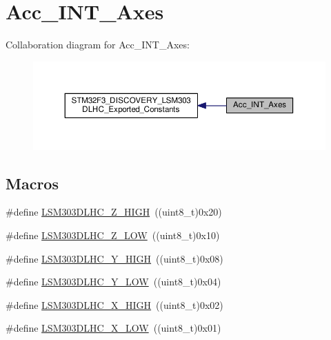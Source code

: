 \hypertarget{group__Acc__INT__Axes}{\section{Acc\+\_\+\+I\+N\+T\+\_\+\+Axes}
\label{group__Acc__INT__Axes}
}
Collaboration diagram for Acc\+\_\+\+I\+N\+T\+\_\+\+Axes\+:\nopagebreak
\begin{figure}[H]
\begin{center}
\leavevmode
\includegraphics[width=350pt]{group__Acc__INT__Axes}
\end{center}
\end{figure}
\subsection*{Macros}
\begin{DoxyCompactItemize}
\item 
\#define \hyperlink{group__Acc__INT__Axes_ga1ed5cf5c88223590c7b36228d02e9107}{L\+S\+M303\+D\+L\+H\+C\+\_\+\+Z\+\_\+\+H\+I\+G\+H}~((uint8\+\_\+t)0x20)
\item 
\#define \hyperlink{group__Acc__INT__Axes_ga28f3cfcc82d142aa1e1bc38fa2979460}{L\+S\+M303\+D\+L\+H\+C\+\_\+\+Z\+\_\+\+L\+O\+W}~((uint8\+\_\+t)0x10)
\item 
\#define \hyperlink{group__Acc__INT__Axes_gad9b4dad344ef3ac932412a890493f2b0}{L\+S\+M303\+D\+L\+H\+C\+\_\+\+Y\+\_\+\+H\+I\+G\+H}~((uint8\+\_\+t)0x08)
\item 
\#define \hyperlink{group__Acc__INT__Axes_ga8ae7ce73627a8bff6e3da43439742ffa}{L\+S\+M303\+D\+L\+H\+C\+\_\+\+Y\+\_\+\+L\+O\+W}~((uint8\+\_\+t)0x04)
\item 
\#define \hyperlink{group__Acc__INT__Axes_ga6b8727ebd43c2664e9a6a4452f3cc69b}{L\+S\+M303\+D\+L\+H\+C\+\_\+\+X\+\_\+\+H\+I\+G\+H}~((uint8\+\_\+t)0x02)
\item 
\#define \hyperlink{group__Acc__INT__Axes_gac1f393e15aff0608dc358f736ffacaea}{L\+S\+M303\+D\+L\+H\+C\+\_\+\+X\+\_\+\+L\+O\+W}~((uint8\+\_\+t)0x01)
\end{DoxyCompactItemize}


